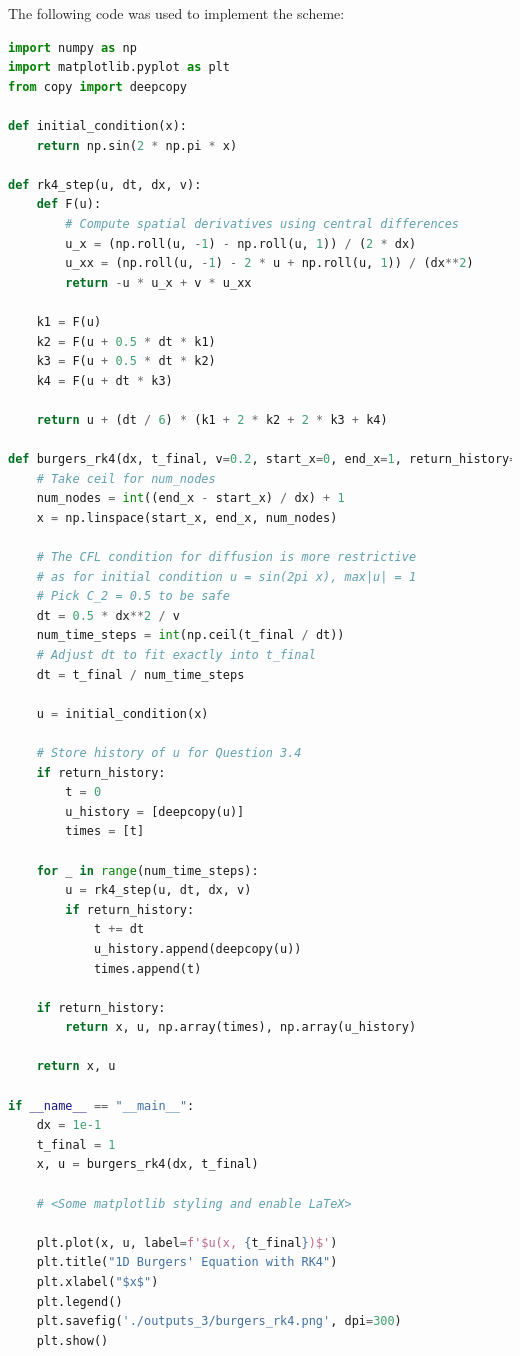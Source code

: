 \documentclass[12pt]{article}
\begin{document}
The following code was used to implement the scheme:
\begin{lstlisting}[language=Python, caption=3.2 Python]
import numpy as np
import matplotlib.pyplot as plt
from copy import deepcopy

def initial_condition(x):
    return np.sin(2 * np.pi * x)

def rk4_step(u, dt, dx, v):
    def F(u):
        # Compute spatial derivatives using central differences
        u_x = (np.roll(u, -1) - np.roll(u, 1)) / (2 * dx)
        u_xx = (np.roll(u, -1) - 2 * u + np.roll(u, 1)) / (dx**2)
        return -u * u_x + v * u_xx

    k1 = F(u)
    k2 = F(u + 0.5 * dt * k1)
    k3 = F(u + 0.5 * dt * k2)
    k4 = F(u + dt * k3)

    return u + (dt / 6) * (k1 + 2 * k2 + 2 * k3 + k4)

def burgers_rk4(dx, t_final, v=0.2, start_x=0, end_x=1, return_history=False):
    # Take ceil for num_nodes
    num_nodes = int((end_x - start_x) / dx) + 1
    x = np.linspace(start_x, end_x, num_nodes)
    
    # The CFL condition for diffusion is more restrictive
    # as for initial condition u = sin(2pi x), max|u| = 1
    # Pick C_2 = 0.5 to be safe
    dt = 0.5 * dx**2 / v
    num_time_steps = int(np.ceil(t_final / dt))
    # Adjust dt to fit exactly into t_final
    dt = t_final / num_time_steps  

    u = initial_condition(x)

    # Store history of u for Question 3.4
    if return_history:
        t = 0
        u_history = [deepcopy(u)]
        times = [t]

    for _ in range(num_time_steps):
        u = rk4_step(u, dt, dx, v)
        if return_history:
            t += dt
            u_history.append(deepcopy(u))
            times.append(t)
            
    if return_history:
        return x, u, np.array(times), np.array(u_history)
    
    return x, u

if __name__ == "__main__":
    dx = 1e-1
    t_final = 1
    x, u = burgers_rk4(dx, t_final)
    
    # <Some matplotlib styling and enable LaTeX>

    plt.plot(x, u, label=f'$u(x, {t_final})$')
    plt.title("1D Burgers' Equation with RK4")
    plt.xlabel("$x$")
    plt.legend()
    plt.savefig('./outputs_3/burgers_rk4.png', dpi=300)
    plt.show()
\end{lstlisting}
\end{document}
